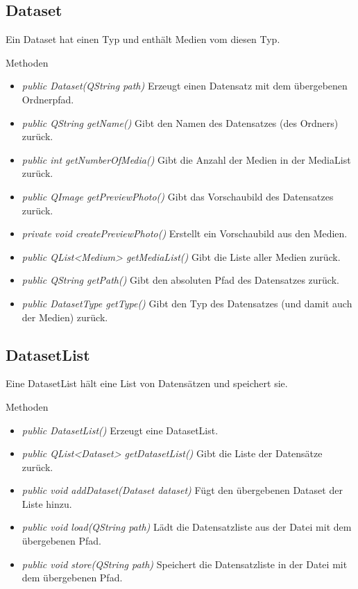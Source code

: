 \subsection*{Dataset}
Ein Dataset hat einen Typ und enthält Medien vom diesen Typ.

Methoden
\begin{itemize}
\item \textit{public Dataset(QString path)} Erzeugt einen Datensatz mit dem übergebenen Ordnerpfad.
\item \textit{public QString getName()} Gibt den Namen des Datensatzes (des Ordners) zurück.
\item \textit{public int getNumberOfMedia()} Gibt die Anzahl der Medien in der MediaList zurück.
\item \textit{public QImage getPreviewPhoto()} Gibt das Vorschaubild des Datensatzes zurück.
\item \textit{private void createPreviewPhoto()} Erstellt ein Vorschaubild aus den Medien.
\item \textit{public QList<Medium> getMediaList()} Gibt die Liste aller Medien zurück.
\item \textit{public QString getPath()} Gibt den absoluten Pfad des Datensatzes zurück.
\item \textit{public DatasetType getType()} Gibt den Typ des Datensatzes (und damit auch der Medien) zurück.
\end{itemize}

\subsection*{DatasetList}
Eine DatasetList hält eine List von Datensätzen und speichert sie.

Methoden
\begin{itemize}
\item \textit{public DatasetList()} Erzeugt eine DatasetList.
\item \textit{public QList<Dataset> getDatasetList()} Gibt die Liste der Datensätze zurück.
\item \textit{public void addDataset(Dataset dataset)} Fügt den übergebenen Dataset der Liste hinzu.
\item \textit{public void load(QString path)} Lädt die Datensatzliste aus der Datei mit dem übergebenen Pfad.
\item \textit{public void store(QString path)} Speichert die Datensatzliste in der Datei mit dem übergebenen Pfad.
\end{itemize}

